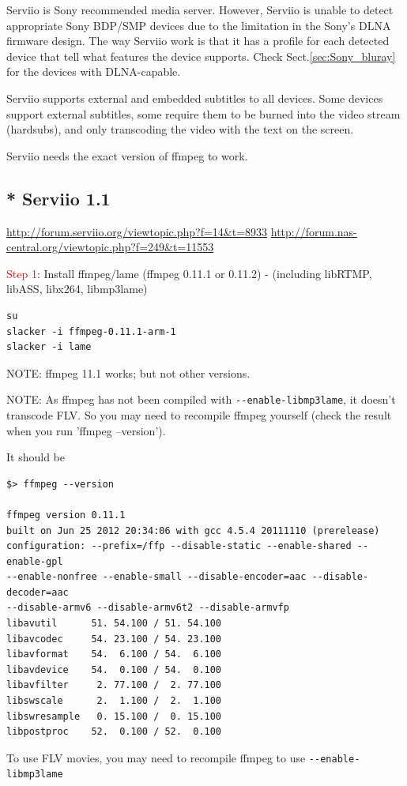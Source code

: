Serviio is Sony recommended media server. However, Serviio is unable to detect
appropriate Sony BDP/SMP devices due to the limitation in the Sony's DLNA
firmware design. The way Serviio work is that it has a profile for each
detected device that tell what features the device supports. Check
Sect.\ref{sec:Sony_bluray} for the devices with DLNA-capable.

Serviio supports external and embedded subtitles to all devices. Some
devices support external subtitles, some require them to be burned into the
video stream (hardsubs), and only transcoding the video with the text on the
screen. 

Serviio needs the exact version of ffmpeg to work.

\subsection{* Serviio 1.1}

\url{http://forum.serviio.org/viewtopic.php?f=14&t=8933}
\url{http://forum.nas-central.org/viewtopic.php?f=249&t=11553}


\textcolor{red}{Step 1}: Install ffmpeg/lame (ffmpeg 0.11.1 or 0.11.2) -
(including libRTMP, libASS, libx264, libmp3lame)
\begin{verbatim}
su
slacker -i ffmpeg-0.11.1-arm-1
slacker -i lame
\end{verbatim}
NOTE: ffmpeg 11.1 works; but not other versions.


NOTE: As ffmpeg has not been compiled with \verb!--enable-libmp3lame!, it
doesn't transcode FLV. So you may need to recompile ffmpeg yourself (check the
result when you run 'ffmpeg --version').

It should be
\begin{verbatim}
$> ffmpeg --version

ffmpeg version 0.11.1
built on Jun 25 2012 20:34:06 with gcc 4.5.4 20111110 (prerelease)
configuration: --prefix=/ffp --disable-static --enable-shared --enable-gpl
--enable-nonfree --enable-small --disable-encoder=aac --disable-decoder=aac
--disable-armv6 --disable-armv6t2 --disable-armvfp  
libavutil      51. 54.100 / 51. 54.100 
libavcodec     54. 23.100 / 54. 23.100
libavformat    54.  6.100 / 54.  6.100
libavdevice    54.  0.100 / 54.  0.100
libavfilter     2. 77.100 /  2. 77.100
libswscale      2.  1.100 /  2.  1.100
libswresample   0. 15.100 /  0. 15.100
libpostproc    52.  0.100 / 52.  0.100
\end{verbatim}
To use FLV movies, you may need to recompile ffmpeg to use
\verb!--enable-libmp3lame!


